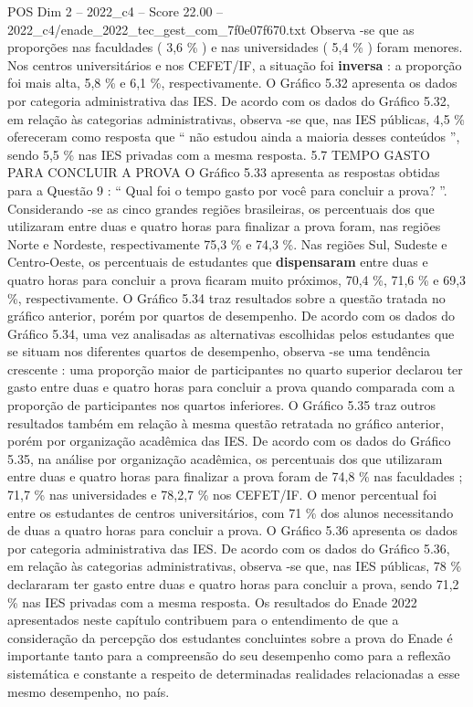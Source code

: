 \begin{textsample}{POS Dim 2 – 2022\_c4 – Score 22.00 – 2022\_c4/enade\_2022\_tec\_gest\_com\_7f0e07f670.txt}
Observa -se que as proporções nas faculdades ( 3,6 \% ) e nas universidades ( 5,4 \% ) foram menores.
Nos centros universitários e nos CEFET/IF, a situação foi \textbf{inversa} : a proporção foi mais alta, 5,8 \% e 6,1 \%, respectivamente.
O Gráfico 5.32 apresenta os dados por categoria administrativa das IES.
De acordo com os dados do Gráfico 5.32, em relação às categorias administrativas, observa -se que, nas IES públicas, 4,5 \% ofereceram como resposta que “ não estudou ainda a maioria desses conteúdos ”, sendo 5,5 \% nas IES privadas com a mesma resposta. 5.7 TEMPO GASTO PARA CONCLUIR A PROVA O Gráfico 5.33 apresenta as respostas obtidas para a Questão 9 : “ Qual foi o tempo gasto por você para concluir a prova? ”.
Considerando -se as cinco grandes regiões brasileiras, os percentuais dos que utilizaram entre duas e quatro horas para finalizar a prova foram, nas regiões Norte e Nordeste, respectivamente 75,3 \% e 74,3 \%.
Nas regiões Sul, Sudeste e Centro-Oeste, os percentuais de estudantes que \textbf{dispensaram} entre duas e quatro horas para concluir a prova ficaram muito próximos, 70,4 \%, 71,6 \% e 69,3 \%, respectivamente.
O Gráfico 5.34 traz resultados sobre a questão tratada no gráfico anterior, porém por quartos de desempenho.
De acordo com os dados do Gráfico 5.34, uma vez analisadas as alternativas escolhidas pelos estudantes que se situam nos diferentes quartos de desempenho, observa -se uma tendência crescente : uma proporção maior de participantes no quarto superior declarou ter gasto entre duas e quatro horas para concluir a prova quando comparada com a proporção de participantes nos quartos inferiores.
O Gráfico 5.35 traz outros resultados também em relação à mesma questão retratada no gráfico anterior, porém por organização acadêmica das IES.
De acordo com os dados do Gráfico 5.35, na análise por organização acadêmica, os percentuais dos que utilizaram entre duas e quatro horas para finalizar a prova foram de 74,8 \% nas faculdades ; 71,7 \% nas universidades e 78,2,7 \% nos CEFET/IF.
O menor percentual foi entre os estudantes de centros universitários, com 71 \% dos alunos necessitando de duas a quatro horas para concluir a prova.
O Gráfico 5.36 apresenta os dados por categoria administrativa das IES.
De acordo com os dados do Gráfico 5.36, em relação às categorias administrativas, observa -se que, nas IES públicas, 78 \% declararam ter gasto entre duas e quatro horas para concluir a prova, sendo 71,2 \% nas IES privadas com a mesma resposta.
Os resultados do Enade 2022 apresentados neste capítulo contribuem para o entendimento de que a consideração da percepção dos estudantes concluintes sobre a prova do Enade é importante tanto para a compreensão do seu desempenho como para a reflexão sistemática e constante a respeito de determinadas realidades relacionadas a esse mesmo desempenho, no país.

\end{textsample}

